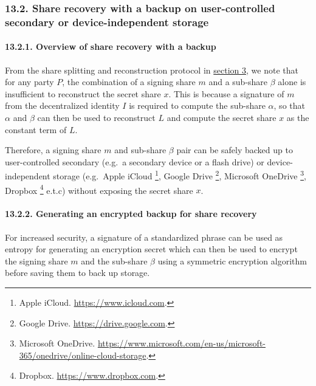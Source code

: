 \documentclass[
]{article}
\begin{document}
\hypertarget{share-recovery-backup}{%
\subsubsection{13.2. Share recovery with a backup on user-controlled
secondary or device-independent storage}\label{share-recovery-backup}}

\hypertarget{share-recovery-backup-overview}{%
\paragraph{13.2.1. Overview of share recovery with a
backup}\label{share-recovery-backup-overview}}

From the share splitting and reconstruction protocol in
\protect\hyperlink{share-splitting-and-reconstruction}{section 3}, we
note that for any party \(P\), the combination of a signing share \(m\)
and a sub-share \(\beta\) alone is insufficient to reconstruct the
secret share \(x\). This is because a signature of \(m\) from the
decentralized identity \(I\) is required to compute the sub-share
\(\alpha\), so that \(\alpha\) and \(\beta\) can then be used to
reconstruct \(L\) and compute the secret share \(x\) as the constant
term of \(L\).

Therefore, a signing share \(m\) and sub-share \(\beta\) pair can be
safely backed up to user-controlled secondary (e.g.~a secondary device
or a flash drive) or device-independent storage (e.g.~Apple iCloud
\footnote{Apple iCloud. \url{https://www.icloud.com}.}, Google Drive
\footnote{Google Drive. \url{https://drive.google.com}.}, Microsoft
OneDrive \footnote{Microsoft OneDrive.
  \url{https://www.microsoft.com/en-us/microsoft-365/onedrive/online-cloud-storage}.},
Dropbox \footnote{Dropbox. \url{https://www.dropbox.com}.} e.t.c)
without exposing the secret share \(x\).

\hypertarget{share-recovery-backup-encrypt}{%
\paragraph{13.2.2. Generating an encrypted backup for share
recovery}\label{share-recovery-backup-encrypt}}

For increased security, a signature of a standardized phrase can be used
as entropy for generating an encryption secret which can then be used to
encrypt the signing share \(m\) and the sub-share \(\beta\) using a
symmetric encryption algorithm before saving them to back up storage.
\end{document}

